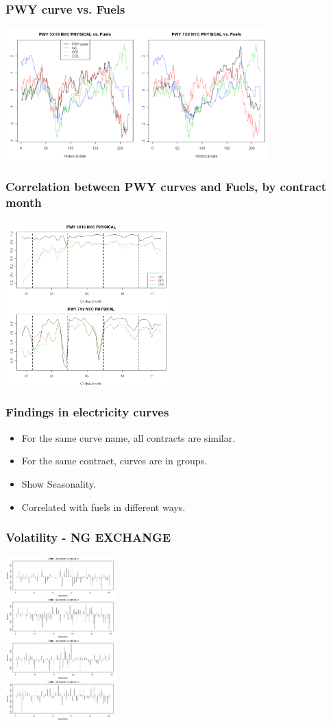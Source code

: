 \documentclass[10pt]{beamer}
\begin{document}
\frame
{
  \frametitle{PWY curve vs. Fuels}
\begin{center}
  \includegraphics[height=2.0in]{figures/pwy-fuel.png}
\end{center}
}

\frame
{
  \frametitle{Correlation between PWY curves and Fuels, by contract month}

\begin{center}
  \includegraphics[height=2.5in]{figures/pwy-fuel-corr.png}
\end{center}
}

\frame
{
  \frametitle{Findings in electricity curves}
\begin{itemize}
\item For the same curve name, all contracts are similar.
\item For the same contract, curves are in groups.
\item Show Seasonality.
\item Correlated with fuels in different ways.
\end{itemize}
}


\frame
{
  \frametitle{Volatility - NG EXCHANGE}

\begin{center}
  \includegraphics[height=2.5in]{figures/ng-exch-vol.png}
\end{center}
}
\end{document}
